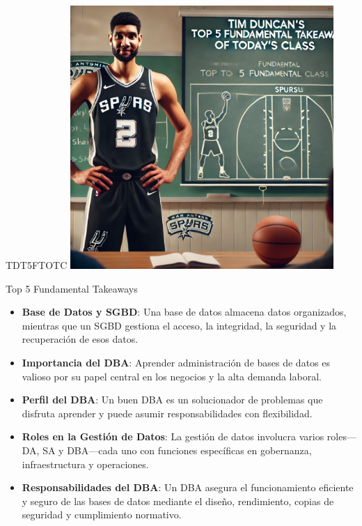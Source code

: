 \documentclass{beamer}
\begin{document}
\begin{frame}{TDT5FTOTC}
    \centering
    \includegraphics[width=0.75\textwidth]{figures/tim.png}
\end{frame}

\begin{frame}{Top 5 Fundamental Takeaways}
    \begin{itemize} \pause
        \small
        \item[5] \textbf{Base de Datos y SGBD}: Una base de datos almacena datos organizados, mientras que un SGBD gestiona el acceso, la integridad, la seguridad y la recuperación de esos datos.\pause


        \item[4] \textbf{Importancia del DBA}: Aprender administración de bases de datos es valioso por su papel central en los negocios y la alta demanda laboral.\pause


        \item[3] \textbf{Perfil del DBA}: Un buen DBA es un solucionador de problemas que disfruta aprender y puede asumir responsabilidades con flexibilidad.\pause


        \item[2] \textbf{Roles en la Gestión de Datos}: La gestión de datos involucra varios roles—DA, SA y DBA—cada uno con funciones específicas en gobernanza, infraestructura y operaciones.\pause


        \item[1] \textbf{Responsabilidades del DBA}: Un DBA asegura el funcionamiento eficiente y seguro de las bases de datos mediante el diseño, rendimiento, copias de seguridad y cumplimiento normativo.
    \end{itemize}
\end{frame}
\end{document}
